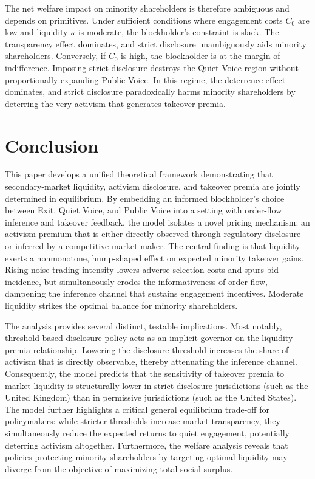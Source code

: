 \documentclass[11pt]{article}
\newcommand{\1}{\mathbf{1}}
\begin{document}
The net welfare impact on minority shareholders is therefore ambiguous and depends on primitives. Under sufficient conditions where engagement costs $C_0$ are low and liquidity $\kappa$ is moderate, the blockholder's constraint is slack. The transparency effect dominates, and strict disclosure unambiguously aids minority shareholders. Conversely, if $C_0$ is high, the blockholder is at the margin of indifference. Imposing strict disclosure destroys the Quiet Voice region without proportionally expanding Public Voice. In this regime, the deterrence effect dominates, and strict disclosure paradoxically harms minority shareholders by deterring the very activism that generates takeover premia.

\section{Conclusion}
\label{sec:conclusion}

This paper develops a unified theoretical framework demonstrating that secondary-market liquidity, activism disclosure, and takeover premia are jointly determined in equilibrium. By embedding an informed blockholder's choice between Exit, Quiet Voice, and Public Voice into a setting with order-flow inference and takeover feedback, the model isolates a novel pricing mechanism: an activism premium that is either directly observed through regulatory disclosure or inferred by a competitive market maker. The central finding is that liquidity exerts a nonmonotone, hump-shaped effect on expected minority takeover gains. Rising noise-trading intensity lowers adverse-selection costs and spurs bid incidence, but simultaneously erodes the informativeness of order flow, dampening the inference channel that sustains engagement incentives. Moderate liquidity strikes the optimal balance for minority shareholders.

The analysis provides several distinct, testable implications. Most notably, threshold-based disclosure policy acts as an implicit governor on the liquidity-premia relationship. Lowering the disclosure threshold increases the share of activism that is directly observable, thereby attenuating the inference channel. Consequently, the model predicts that the sensitivity of takeover premia to market liquidity is structurally lower in strict-disclosure jurisdictions (such as the United Kingdom) than in permissive jurisdictions (such as the United States). The model further highlights a critical general equilibrium trade-off for policymakers: while stricter thresholds increase market transparency, they simultaneously reduce the expected returns to quiet engagement, potentially deterring activism altogether. Furthermore, the welfare analysis reveals that policies protecting minority shareholders by targeting optimal liquidity may diverge from the objective of maximizing total social surplus.
\end{document}
